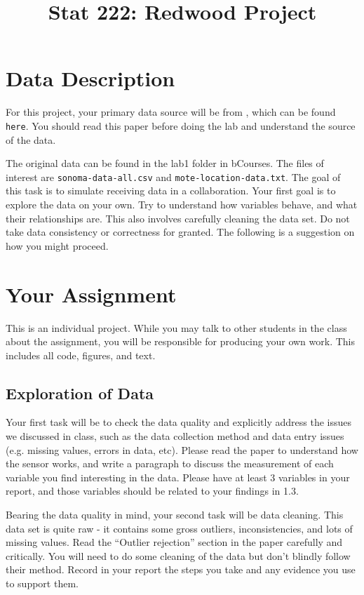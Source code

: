 \documentclass[11pt, oneside]{article}   	%
\title{Stat 222: Redwood Project}
\date{}							%
\begin{document}
\maketitle

\section{Data Description}

For this project, your primary data source will be from \cite{tolle2005macroscope}, which can
be found \texttt{here}. You should read this paper before doing the lab and
understand the source of the data.

The original data can be found in the lab1 folder in bCourses. The files of
interest are \texttt{sonoma-data-all.csv} and \texttt{mote-location-data.txt}. The goal of this
task is to simulate receiving data in a collaboration. Your first goal is to
explore the data on your own. Try to understand how variables behave, and what
their relationships are. This also involves carefully cleaning the data set. Do
not take data consistency or correctness for granted. The following is a
suggestion on how you might proceed.

\section{Your Assignment}

This is an individual project.  While you may talk to other students in the
class about the assignment, you will be responsible for producing your own
work.  This includes all code, figures, and text.


\subsection*{Exploration of Data}

Your first task will be to check the data quality and explicitly address the
issues we discussed in class, such as the data collection method and data entry
issues (e.g. missing values, errors in data, etc). Please read the paper to
understand how the sensor works, and write a paragraph to discuss the
measurement of each variable you find interesting in the data. Please have at
least 3 variables in your report, and those variables should be related to your
findings in 1.3.

Bearing the data quality in mind, your second task will be data cleaning. This
data set is quite raw - it contains some gross outliers, inconsistencies, and
lots of missing values. Read the ``Outlier rejection'' section in the paper
carefully and critically.  You will need to do some cleaning of the data but
don’t blindly follow their method. Record in your report the steps you take and
any evidence you use to support them.
\end{document}
